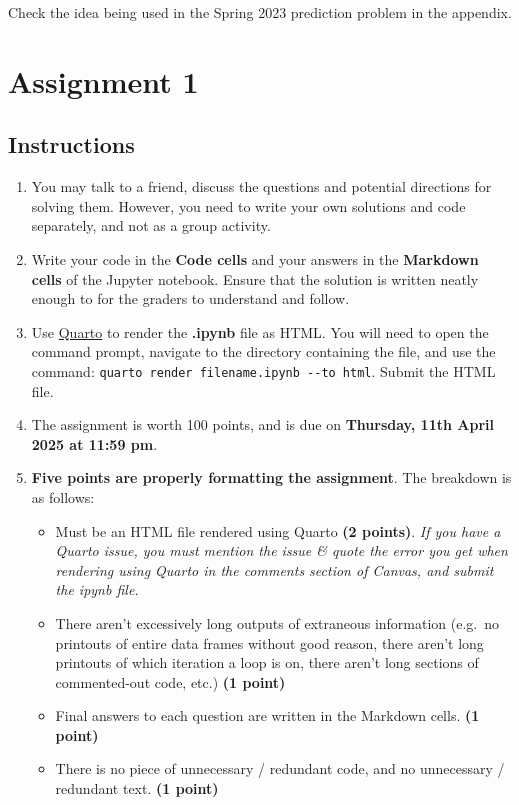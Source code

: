 \documentclass[
  letterpaper,
  DIV=11,
  numbers=noendperiod]{scrreprt}
\providecommand{\tightlist}{%
  \setlength{\itemsep}{0pt}\setlength{\parskip}{0pt}}\usepackage{longtable,booktabs,array}
\begin{document}
Check the idea being used in the Spring 2023 prediction problem in the
appendix.

\cleardoublepage
{}
{}
\appendix

\chapter{Assignment 1}\label{assignment-1}

\section*{Instructions}\label{instructions}


\begin{enumerate}
\def\labelenumi{\arabic{enumi}.}
\item
  You may talk to a friend, discuss the questions and potential
  directions for solving them. However, you need to write your own
  solutions and code separately, and not as a group activity.
\item
  Write your code in the \textbf{Code cells} and your answers in the
  \textbf{Markdown cells} of the Jupyter notebook. Ensure that the
  solution is written neatly enough to for the graders to understand and
  follow.
\item
  Use
  \href{https://quarto.org/docs/output-formats/html-basics.html}{Quarto}
  to render the \textbf{.ipynb} file as HTML. You will need to open the
  command prompt, navigate to the directory containing the file, and use
  the command: \texttt{quarto\ render\ filename.ipynb\ -\/-to\ html}.
  Submit the HTML file.
\item
  The assignment is worth 100 points, and is due on \textbf{Thursday,
  11th April 2025 at 11:59 pm}.
\item
  \textbf{Five points are properly formatting the assignment}. The
  breakdown is as follows:

  \begin{itemize}
  \tightlist
  \item
    Must be an HTML file rendered using Quarto \textbf{(2 points)}.
    \emph{If you have a Quarto issue, you must mention the issue \&
    quote the error you get when rendering using Quarto in the comments
    section of Canvas, and submit the ipynb file.}
  \item
    There aren't excessively long outputs of extraneous information
    (e.g.~no printouts of entire data frames without good reason, there
    aren't long printouts of which iteration a loop is on, there aren't
    long sections of commented-out code, etc.) \textbf{(1 point)}
  \item
    Final answers to each question are written in the Markdown cells.
    \textbf{(1 point)}
  \item
    There is no piece of unnecessary / redundant code, and no
    unnecessary / redundant text. \textbf{(1 point)}
  \end{itemize}
\end{enumerate}
\end{document}
